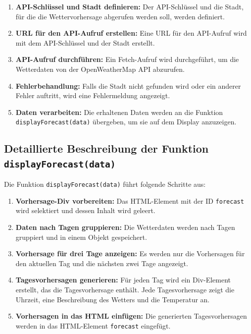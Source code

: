 \begin{enumerate}
    \item \textbf{API-Schlüssel und Stadt definieren:}
    Der API-Schlüssel und die Stadt, für die die Wettervorhersage abgerufen werden soll, werden definiert.
    
    \item \textbf{URL für den API-Aufruf erstellen:}
    Eine URL für den API-Aufruf wird mit dem API-Schlüssel und der Stadt erstellt.
    
    \item \textbf{API-Aufruf durchführen:}
    Ein Fetch-Aufruf wird durchgeführt, um die Wetterdaten von der OpenWeatherMap API abzurufen.
    
    \item \textbf{Fehlerbehandlung:}
    Falls die Stadt nicht gefunden wird oder ein anderer Fehler auftritt, wird eine Fehlermeldung angezeigt.
    
    \item \textbf{Daten verarbeiten:}
    Die erhaltenen Daten werden an die Funktion \texttt{displayForecast(data)} übergeben, um sie auf dem Display anzuzeigen.
\end{enumerate}

\subsection*{Detaillierte Beschreibung der Funktion \texttt{displayForecast(data)}}
Die Funktion \texttt{displayForecast(data)} führt folgende Schritte aus:

\begin{enumerate}
    \item \textbf{Vorhersage-Div vorbereiten:}
    Das HTML-Element mit der ID \texttt{forecast} wird selektiert und dessen Inhalt wird geleert.
    
    \item \textbf{Daten nach Tagen gruppieren:}
    Die Wetterdaten werden nach Tagen gruppiert und in einem Objekt gespeichert.
    
    \item \textbf{Vorhersage für drei Tage anzeigen:}
    Es werden nur die Vorhersagen für den aktuellen Tag und die nächsten zwei Tage angezeigt.
    
    \item \textbf{Tagesvorhersagen generieren:}
    Für jeden Tag wird ein Div-Element erstellt, das die Tagesvorhersage enthält. Jede Tagesvorhersage zeigt die Uhrzeit, eine Beschreibung des Wetters und die Temperatur an.
    
    \item \textbf{Vorhersagen in das HTML einfügen:}
    Die generierten Tagesvorhersagen werden in das HTML-Element \texttt{forecast} eingefügt.
\end{enumerate}


